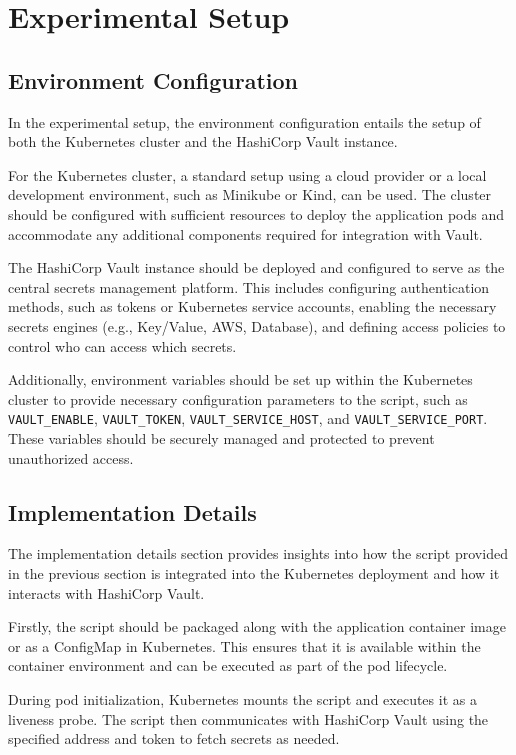 \section{Experimental Setup}

\subsection{Environment Configuration}

In the experimental setup, the environment configuration entails the setup of both the Kubernetes cluster and the HashiCorp Vault instance.

For the Kubernetes cluster, a standard setup using a cloud provider or a local development environment, such as Minikube or Kind, can be used. The cluster should be configured with sufficient resources to deploy the application pods and accommodate any additional components required for integration with Vault.

The HashiCorp Vault instance should be deployed and configured to serve as the central secrets management platform. This includes configuring authentication methods, such as tokens or Kubernetes service accounts, enabling the necessary secrets engines (e.g., Key/Value, AWS, Database), and defining access policies to control who can access which secrets.

Additionally, environment variables should be set up within the Kubernetes cluster to provide necessary configuration parameters to the script, such as \texttt{VAULT\_ENABLE}, \texttt{VAULT\_TOKEN}, \texttt{VAULT\_SERVICE\_HOST}, and \texttt{VAULT\_SERVICE\_PORT}. These variables should be securely managed and protected to prevent unauthorized access.

\subsection{Implementation Details}

The implementation details section provides insights into how the script provided in the previous section is integrated into the Kubernetes deployment and how it interacts with HashiCorp Vault.

Firstly, the script should be packaged along with the application container image or as a ConfigMap in Kubernetes. This ensures that it is available within the container environment and can be executed as part of the pod lifecycle.

During pod initialization, Kubernetes mounts the script and executes it as a liveness probe. The script then communicates with HashiCorp Vault using the specified address and token to fetch secrets as needed.

